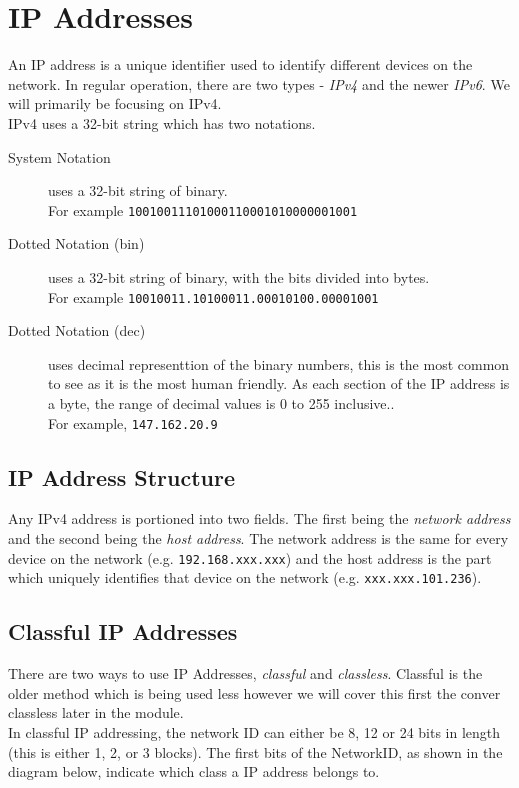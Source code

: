 \section{IP Addresses}
An IP address is a unique identifier used to identify different devices on the network. In regular operation, there are two types - \textit{IPv4} and the newer \textit{IPv6}. We will primarily be focusing on IPv4.\\

IPv4 uses a 32-bit string which has two notations.
\begin{description}
    \item[System Notation] uses a 32-bit string of binary.\\ For example \verb|10010011101000110001010000001001|
    \item[Dotted Notation (bin)] uses a 32-bit string of binary, with the bits divided into bytes.\\ For example \verb|10010011.10100011.00010100.00001001|
    \item[Dotted Notation (dec)] uses decimal representtion of the binary numbers, this is the most common to see as it is the most human friendly. As each section of the IP address is a byte, the range of decimal values is 0 to 255 inclusive..\\ For example, \verb|147.162.20.9|
\end{description}

\subsection{IP Address Structure}
Any IPv4 address is portioned into two fields. The first being the \textit{network address} and the second being the \textit{host address}. The network address is the same for every device on the network (e.g. \verb|192.168.xxx.xxx|) and the host address is the part which uniquely identifies that device on the network (e.g. \verb|xxx.xxx.101.236|). 

\subsection{Classful IP Addresses}
There are two ways to use IP Addresses, \textit{classful} and \textit{classless}. Classful is the older method which is being used less however we will cover this first the conver classless later in the module.\\

In classful IP addressing, the network ID can either be 8, 12 or 24 bits in length (this is either 1, 2, or 3 blocks). The first bits of the NetworkID, as shown in the diagram below, indicate which class a IP address belongs to.


